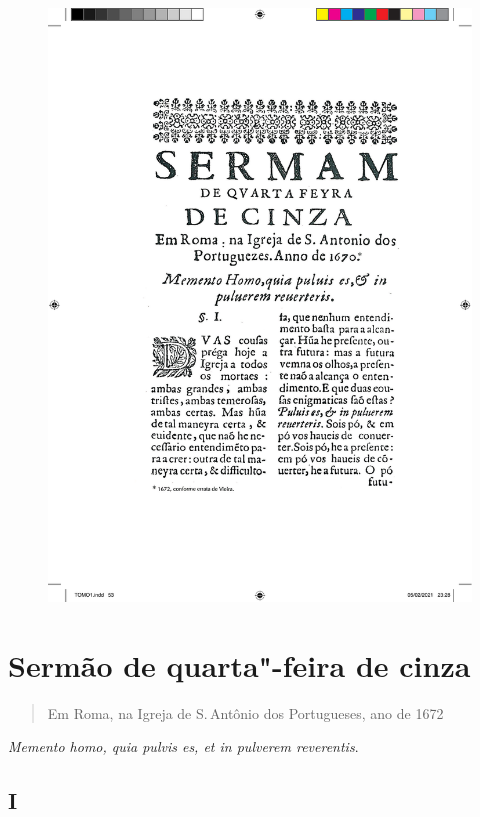 \pagebreak
\thispagestyle{empty}
\movetoevenpage
\begin{figure}
\includegraphics[width=\textwidth]{./imgs/cinza.pdf}  
\end{figure}

\chapter{Sermão de quarta"-feira de cinza}

\begin{quotation}
\noindent{}Em Roma, na Igreja de S.\,Antônio dos Portugueses, ano de 1672
\end{quotation}

\epigraph{\emph{Memento homo, quia pulvis es, et in pulverem reverentis}.}{}

\section*{I}

